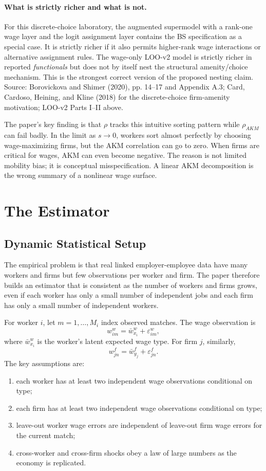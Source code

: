 \documentclass[11pt]{article}
\begin{document}
\paragraph{What is strictly richer and what is not.}
For this discrete-choice laboratory, the augmented supermodel with a rank-one
wage layer and the logit assignment layer contains the BS specification as a
special case.  It is strictly richer if it also permits higher-rank wage
interactions or alternative assignment rules.  The wage-only LOO-v2 model is
strictly richer in reported \emph{functionals} but does not by itself nest the
structural amenity/choice mechanism.  This is the strongest correct version of
the proposed nesting claim.  Source: Borovickova and Shimer (2020), pp. 14--17
and Appendix A.3;
Card, Cardoso, Heining, and Kline (2018) for the discrete-choice firm-amenity
motivation; LOO-v2 Parts I--II above.

The paper's key finding is that $\rho$ tracks this intuitive sorting pattern while $\rho_{AKM}$ can fail badly. In the limit as $s\to0$, workers sort almost perfectly by choosing wage-maximizing firms, but the AKM correlation can go to zero. When firms are critical for wages, AKM can even become negative. The reason is not limited mobility bias; it is conceptual misspecification. A linear AKM decomposition is the wrong summary of a nonlinear wage surface.

\section{The Estimator}

\subsection{Dynamic Statistical Setup}

The empirical problem is that real linked employer-employee data have many workers and firms but few observations per worker and firm. The paper therefore builds an estimator that is consistent as the number of workers and firms grows, even if each worker has only a small number of independent jobs and each firm has only a small number of independent workers.

For worker $i$, let $m=1,\ldots,M_i$ index observed matches. The wage observation is
\[
  w^w_{im}=\bar w^w_{x_i}+\varepsilon^w_{im},
\]
where $\bar w^w_{x_i}$ is the worker's latent expected wage type. For firm $j$, similarly,
\[
  w^f_{jn}=\bar w^f_{y_j}+\varepsilon^f_{jn}.
\]
The key assumptions are:
\begin{enumerate}[leftmargin=*]
  \item each worker has at least two independent wage observations conditional on type;
  \item each firm has at least two independent wage observations conditional on type;
  \item leave-out worker wage errors are independent of leave-out firm wage errors for the current match;
  \item cross-worker and cross-firm shocks obey a law of large numbers as the economy is replicated.
\end{enumerate}
\end{document}
